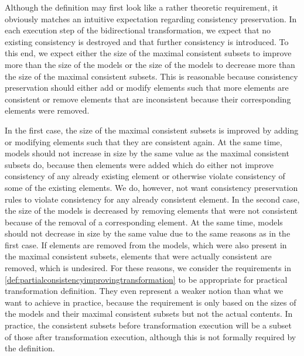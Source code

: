Although the definition may first look like a rather theoretic requirement, it obviously matches an intuitive expectation regarding consistency preservation.
In each execution step of the bidirectional transformation, we expect that no existing consistency is destroyed and that further consistency is introduced.
To this end, we expect either the size of the maximal consistent subsets to improve more than the size of the models or the size of the models to decrease more than the size of the maximal consistent subsets.
This is reasonable because consistency preservation should either add or modify elements such that more elements are consistent or remove elements that are inconsistent because their corresponding elements were removed.

In the first case, the size of the maximal consistent subsets is improved by adding or modifying elements such that they are consistent again.
At the same time, models should not increase in size by the same value as the maximal consistent subsets do, because then elements were added which do either not improve consistency of any already existing element or otherwise violate consistency of some of the existing elements.
We do, however, not want consistency preservation rules to violate consistency for any already consistent element.
In the second case, the size of the models is decreased by removing elements that were not consistent because of the removal of a corresponding element.
At the same time, models should not decrease in size by the same value due to the same reasons as in the first case.
If elements are removed from the models, which were also present in the maximal consistent subsets, elements that were actually consistent are removed, which is undesired.
For these reasons, we consider the requirements in \autoref{def:partialconsistencyimprovingtransformation} to be appropriate for practical transformation definition.
They even represent a weaker notion than what we want to achieve in practice, because the requirement is only based on the sizes of the models and their maximal consistent subsets but not the actual contents.
In practice, the consistent subsets before transformation execution will be a subset of those after transformation execution, although this is not formally required by the definition.

